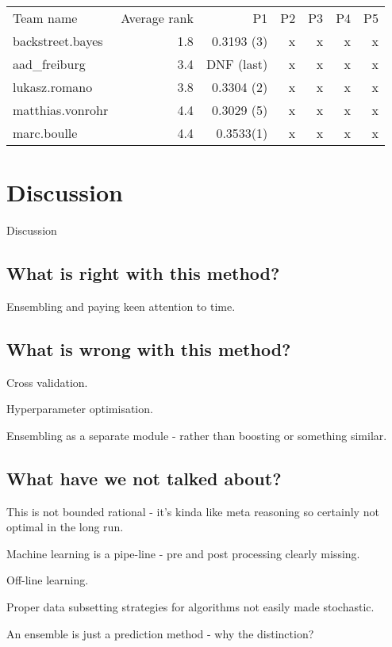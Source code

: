 \documentclass{article} %
\begin{document}
\begin{table}
  \center
  \begin{tabular}{lrrrrrr}
    Team name & Average rank & P1 & P2 & P3 & P4 & P5 \\
    backstreet.bayes & 1.8 & 0.3193 (3) & x & x & x & x\\
    aad\_freiburg    & 3.4 & DNF (last) & x & x & x & x \\
    lukasz.romano    & 3.8 & 0.3304 (2) & x & x & x & x \\
    matthias.vonrohr & 4.4 & 0.3029 (5) & x & x & x & x \\
    marc.boulle      & 4.4 & 0.3533(1) & x & x & x & x
  \end{tabular}
\end{table}

\section{Discussion}

Discussion

\subsection{What is right with this method?}

Ensembling and paying keen attention to time.

\subsection{What is wrong with this method?}

Cross validation.

Hyperparameter optimisation.

Ensembling as a separate module - rather than boosting or something similar.

\subsection{What have we not talked about?}

This is not bounded rational - it's kinda like meta reasoning so certainly not optimal in the long run.

Machine learning is a pipe-line - pre and post processing clearly missing.

Off-line learning.

Proper data subsetting strategies for algorithms not easily made stochastic.

An ensemble is just a prediction method - why the distinction?


\small



\end{document}
